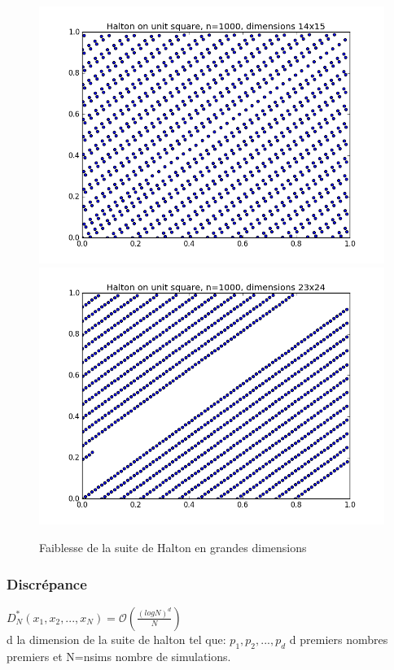 \documentclass[12pt]{report}
\begin{document}
\begin{figure}[!h]
\centering
\includegraphics[scale=0.5]{figure_2-halton-dimensions 14 15.png}
\includegraphics[scale=0.5]{figure_2-halton-dimensions 23 24.png}	
\caption{Faiblesse de la suite de Halton en grandes dimensions}
\end{figure}

\subsubsection{Discrépance}
$D_N^*(x_1,x_2,...,x_N)=\mathcal{O}(\frac{(logN)^d}{N}) $\\
d la dimension de la suite de halton tel que: $p_1,p_2,...,p_d$ d premiers nombres premiers et N=nsims nombre de simulations.
\end{document}
